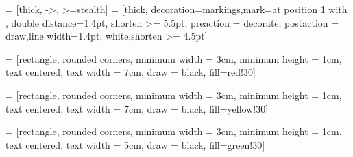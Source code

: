  = [thick, ->, >=stealth]
 = [thick, decoration={markings,mark=at position
   1 with {}},
   double distance=1.4pt, shorten >= 5.5pt,
   preaction = {decorate},
   postaction = {draw,line width=1.4pt, white,shorten >= 4.5pt}]

 = [rectangle, rounded corners, minimum width = 3cm, minimum height = 1cm, text centered, text width = 7cm, draw = black, fill=red!30]

 = [rectangle, rounded corners, minimum width = 3cm, minimum height = 1cm, text centered, text width = 7cm, draw = black, fill=yellow!30]

 = [rectangle, rounded corners, minimum width = 3cm, minimum height = 1cm, text centered, text width = 5cm, draw = black, fill=green!30]
    
\begin{minipage}[c]{.45\linewidth}
\end{minipage}

